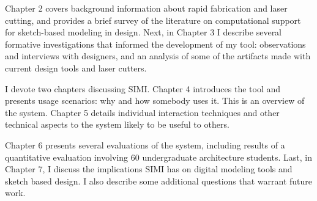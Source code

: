 Chapter 2 covers background information about rapid fabrication and
laser cutting, and provides a brief survey of the literature on
computational support for sketch-based modeling in design. Next, in
Chapter 3 I describe several formative investigations that informed
the development of my tool: observations and interviews with
designers, and an analysis of some of the artifacts made with current
design tools and laser cutters.

I devote two chapters discussing SIMI. Chapter 4 introduces the tool
and presents usage scenarios: why and how somebody uses it. This is an
overview of the system. Chapter 5 details individual interaction
techniques and other technical aspects to the system likely to be
useful to others.

Chapter 6 presents several evaluations of the system, including
results of a quantitative evaluation involving 60 undergraduate
architecture students. Last, in Chapter 7, I discuss the implications
SIMI has on digital modeling tools and sketch based design. I also
describe some additional questions that warrant future work.

